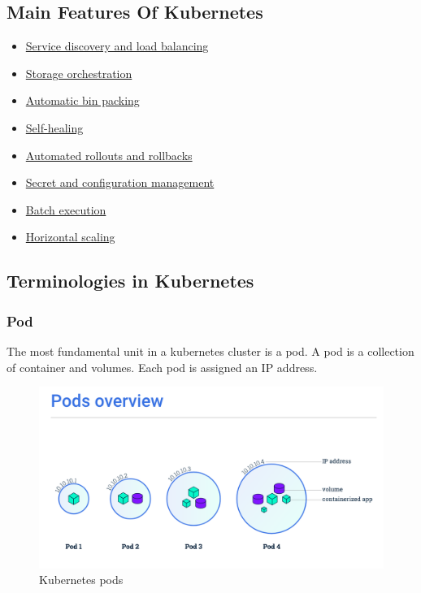 \documentclass[12pt]{report}
\begin{document}
\subsection{Main Features Of Kubernetes}
\begin{itemize}
	\item \href{https://kubernetes.io/docs/concepts/services-networking/service/}{Service discovery and load balancing}
	\item \href{https://kubernetes.io/docs/concepts/storage/persistent-volumes/}{Storage orchestration}
	\item \href{https://kubernetes.io/docs/concepts/configuration/manage-compute-resources-container/}{Automatic bin packing}
	\item \href{https://kubernetes.io/docs/concepts/workloads/controllers/replicationcontroller/#how-a-replicationcontroller-works}{Self-healing}
	\item \href{https://kubernetes.io/docs/concepts/workloads/controllers/deployment/}{Automated rollouts and rollbacks}
	\item \href{https://kubernetes.io/docs/concepts/configuration/secret/}{Secret and configuration management}
	\item \href{https://kubernetes.io/docs/concepts/workloads/controllers/jobs-run-to-completion/}{Batch execution}
	\item \href{https://kubernetes.io/docs/tasks/run-application/horizontal-pod-autoscale/}{Horizontal scaling}
\end{itemize}
\subsection{Terminologies in Kubernetes}
\subsubsection{Pod}
The most fundamental unit in a kubernetes cluster is a pod. A pod is a collection of container and volumes. Each pod is assigned an IP address.\\
\begin{figure}[h!]
	\begin{center}
		\includegraphics[width=\textwidth, trim= 0 0 0 7cm, clip=true]{pods}
		\caption{Kubernetes pods \cite{Pods}}
	\end{center}
\end{figure}
\end{document}

